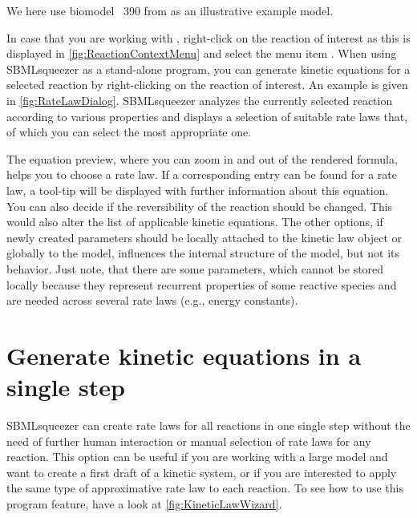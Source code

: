 We here use biomodel \numero~390 from \BioModels \citep{Li2010a, Arnold2011} as an illustrative example model.

In case that you are working with \CellDesigner \citep{Funahashi2003, Funahashi2006, Funahashi2007a, Funahashi2008}, right-click on the reaction of interest as this is displayed in \vref{fig:ReactionContextMenu} and select the menu item .
When using SBMLsqueezer as a stand-alone program, you can generate kinetic equations for a selected reaction by right-clicking on the reaction of interest.
An example is given in \vref{fig:RateLawDialog}.
SBMLsqueezer analyzes the currently selected reaction according to various properties
and displays a selection of suitable rate laws that, of which you can select
the most appropriate one.

The equation preview, where you can zoom in and out of the rendered formula, helps you to choose a rate law. If a corresponding \SBO entry can be found for a rate law, a tool-tip will be displayed with further information about this equation.
You can also decide if the reversibility of the reaction should be changed.
This would also alter the list of applicable kinetic equations.
The other options, if newly created
parameters should be locally attached to the kinetic law object or globally to
the model, influences the internal structure of the model, but not its behavior.
Just note, that there are some parameters, which cannot be stored locally because
they represent recurrent properties of some reactive species and are needed
across several rate laws (e.g., energy constants).

\section{Generate kinetic equations in a single step}

SBMLsqueezer can create rate laws for all reactions in one single step without the need of further human interaction or manual selection of rate laws for any reaction.
This option can %
be %
useful if you are working with a large model and want to create a first draft of a kinetic system, or if you are interested to apply the same type of approximative rate law to each reaction.
To see how to use this program feature, have a look at \vref{fig:KineticLawWizard}.

